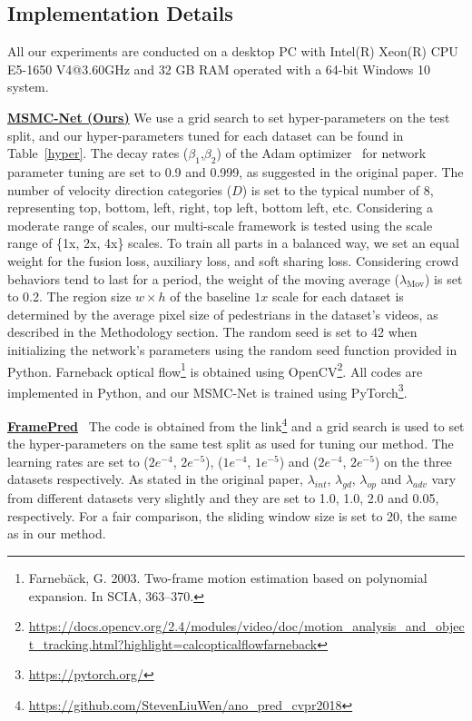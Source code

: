 \documentclass[journal]{IEEEtran}
\begin{document}
\vskip -0.03in
\subsection{Implementation Details}\label{appendix:implementation}
All our experiments are conducted on a desktop PC with Intel(R) Xeon(R) CPU E5-1650 V4@3.60GHz and 32 GB RAM operated with a 64-bit Windows 10 system.


\noindent \underline{\textbf{MSMC-Net (Ours)}}
We use a grid search to set hyper-parameters on the test split, and our hyper-parameters tuned for each dataset can be found in Table~\ref{hyper}.
The decay rates ($ \beta_{1} $,$ \beta_{2} $) of the Adam optimizer~\cite{kingma2015adam} for network parameter tuning are set to 0.9 and 0.999, as suggested in the original paper. The number of velocity direction categories ($D$) is set to the typical number of 8, representing top, bottom, left, right, top left, bottom left, etc. Considering a moderate range of scales, our multi-scale framework is tested using the scale range of \{1x, 2x, 4x\} scales. To train all parts in a balanced way, we set an equal weight for the fusion loss, auxiliary loss, and soft sharing loss. Considering crowd behaviors tend to last for a period, the weight of the moving average ($ \lambda_\mathrm{Mov} $) is set to 0.2. The region size $w\times h$ of the baseline $1x$ scale for each dataset is determined by the average pixel size of pedestrians in the dataset's videos, as described in the Methodology section. The random seed is set to 42 when initializing the network's parameters using the random seed function provided in Python. Farneback optical flow\footnote{Farneb{\"a}ck, G. 2003. Two-frame motion estimation based on polynomial expansion. In SCIA, 363–370.} is obtained using OpenCV\footnote{\url{https://docs.opencv.org/2.4/modules/video/doc/motion_analysis_and_object_tracking.html?highlight=calcopticalflowfarneback}}. All codes are implemented in Python, and our MSMC-Net is trained using PyTorch\footnote{\url{https://pytorch.org/}}.

\vskip 0.03in
\noindent \underline{\textbf{FramePred}}~\cite{liu2018future} The code is obtained from the link\footnote{\url{https://github.com/StevenLiuWen/ano_pred_cvpr2018}} and a grid search is used to set the hyper-parameters on the same test split as used for tuning our method. The learning rates are set to ($2e^{-4}$, $2e^{-5}$), ($1e^{-4}$, $1e^{-5}$) and ($2e^{-4}$, $2e^{-5}$) on the three datasets respectively. As stated in the original paper, $\lambda_{int}$, $\lambda_{gd}$, $\lambda_{op}$ and $\lambda_{adv}$ vary from different datasets very slightly and they are set to 1.0, 1.0, 2.0 and 0.05, respectively. For a fair comparison, the sliding window size is set to 20, the same as in our method.
\end{document}

